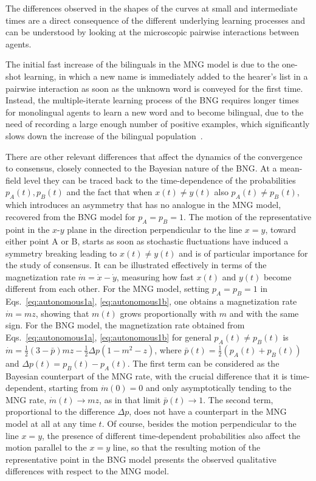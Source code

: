 \documentclass[review]{elsarticle}
\newcommand{\+}{\! + \!}
\begin{document}
The differences observed in the shapes of the curves at small and intermediate times are a direct consequence of the different underlying learning processes and can be understood by looking at the microscopic pairwise interactions between agents. 


The initial fast increase of the bilinguals in the MNG model is due to the one-shot learning, in which a new name is immediately added to the hearer's list in a pairwise interaction as soon as the unknown word is conveyed for the first time.  
Instead, the multiple-iterate learning process of the BNG requires longer times for monolingual agents to learn a new word and to become bilingual, due to the need of recording a large enough number of positive examples, which significantly slows down the increase of the bilingual population~\cite{Marchetti-2020a}.


There are other relevant differences that affect the dynamics of the convergence to consensus, closely connected to the Bayesian nature of the BNG.
At a mean-field level they can be traced back to the time-dependence of the probabilities $p_A(t), p_B(t)$ and the fact that when $x(t) \ne y(t)$ also $p_A(t) \ne p_B(t)$, which introduces an asymmetry that has no analogue in the MNG model, recovered from the BNG model for $p_A = p_B = 1$.
The motion of the representative point in the $x$-$y$ plane in the direction perpendicular to the line $x=y$, toward either point A or B, starts as soon as stochastic fluctuations have induced a symmetry breaking leading to $x(t) \ne y(t)$ and is of particular importance for the study of consensus.
It can be illustrated effectively in terms of the magnetization rate $\dot{m} = \dot{x} - \dot{y}$, measuring how fast $x(t)$ and $y(t)$ become different from each other.
For the MNG model, setting $p_A = p_B = 1$ in Eqs.~\eqref{eq:autonomous1a}, \eqref{eq:autonomous1b}, one obtains a magnetization rate
$\dot{m} = m z$, showing that $m(t)$ grows proportionally with $m$ and with the same sign.
For the BNG model, the magnetization rate obtained from Eqs.~\eqref{eq:autonomous1a}, \eqref{eq:autonomous1b} for general $p_A(t) \ne p_B(t)$ is
$\dot{m} = \frac{1}{2}(3 - \bar{p}) m z - \frac{1}{2} \Delta p (1 - m^2 - z)$, where 
$\bar{p}(t) = \frac{1}{2}(p_A(t)+p_B(t))$ and 
$\Delta{p}(t) = p_B(t)-p_A(t)$.
The first term can be considered as the Bayesian counterpart of the MNG rate, with the crucial difference that it is time-dependent, starting from $\dot{m}(0)=0$ and only asymptotically tending to the MNG rate, $\dot{m}(t) \to m z$, as in that limit $\bar{p}(t) \to 1$.
The second term, proportional to the difference $\Delta p$, does not have a counterpart in the MNG model at all at any time $t$.
Of course, besides the motion perpendicular to the line $x=y$, the presence of different time-dependent probabilities also affect the motion parallel to the $x=y$ line, so that the resulting motion of the representative point in the BNG model presents the observed qualitative differences with respect to the MNG model.
\end{document}
